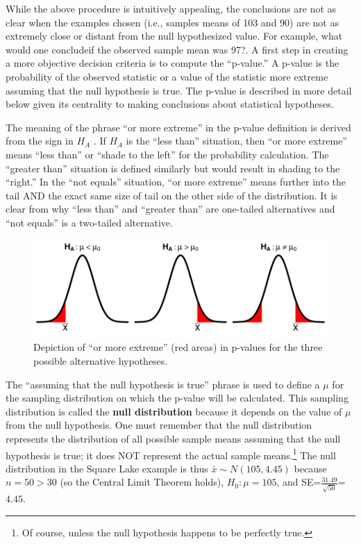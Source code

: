 \documentclass[10pt,openany]{book}\usepackage[]{graphicx}\usepackage[]{color}
\newenvironment{knitrout}{}{} %
\begin{document}
While the above procedure is intuitively appealing, the conclusions are not as clear when the examples chosen (i.e., samples means of 103 and 90) are not as extremely close or distant from the null hypothesized value. For example, what would one concludeif the observed sample mean was 97?. A first step in creating a more objective decision criteria is to compute the ``p-value.'' A p-value is the probability of the observed statistic or a value of the statistic more extreme assuming that the null hypothesis is true. The p-value is described in more detail below given its centrality to making conclusions about statistical hypotheses.

The meaning of the phrase ``or more extreme'' in the p-value definition is derived from the sign in $H_{A}$ . If $H_{A}$ is the ``less than'' situation, then ``or more extreme'' means ``less than'' or ``shade to the left'' for the probability calculation. The ``greater than'' situation is defined similarly but would result in shading to the ``right.''  In the ``not equals'' situation, ``or more extreme'' means further into the tail AND the exact same size of tail on the other side of the distribution. It is clear from  why ``less than'' and ``greater than'' are one-tailed alternatives and ``not equals'' is a two-tailed alternative.

\begin{knitrout}
\color{fgcolor}\begin{figure}[hbtp]

{\centering \includegraphics[width=.8\linewidth]{Figs/HOtails-1} 

}

\caption[Depiction of ``or more extreme'' (red areas) in p-values for the three possible alternative hypotheses]{Depiction of ``or more extreme'' (red areas) in p-values for the three possible alternative hypotheses.}\label{fig:HOtails}
\end{figure}


\end{knitrout}

The ``assuming that the null hypothesis is true'' phrase is used to define a $\mu$ for the sampling distribution on which the p-value will be calculated. This sampling distribution is called the \textbf{null distribution} because it depends on the value of $\mu$ from the null hypothesis. One must remember that the null distribution represents the distribution of all possible sample means assuming that the null hypothesis is true; it does NOT represent the actual sample means.\footnote{Of course, unless the null hypothesis happens to be perfectly true.}  The null distribution in the Square Lake example is thus $\bar{x}\sim N(105,4.45)$ because $n=50>30$ (so the Central Limit Theorem holds), $H_{0}:\mu=105$, and SE=$\frac{31.49}{\sqrt{50}}$=$4.45$.
\end{document}
